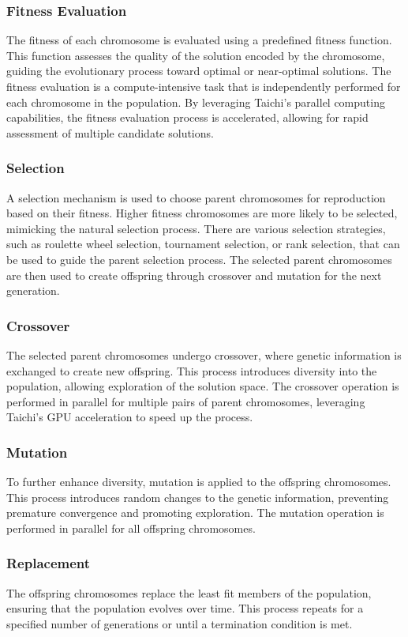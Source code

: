\documentclass[conference]{IEEEtran}
\begin{document}
\subsubsection{Fitness Evaluation}
The fitness of each chromosome is evaluated using a predefined fitness
function. This function assesses the quality of the solution encoded by the
chromosome, guiding the evolutionary process toward optimal or near-optimal
solutions. The fitness evaluation is a compute-intensive task that is
independently performed for each chromosome in the population. By leveraging
Taichi's parallel computing capabilities, the fitness evaluation process is
accelerated, allowing for rapid assessment of multiple candidate solutions.

\subsubsection{Selection}
A selection mechanism is used to choose parent chromosomes for reproduction
based on their fitness. Higher fitness chromosomes are more likely to be
selected, mimicking the natural selection process. There are various selection
strategies, such as roulette wheel selection, tournament selection, or rank
selection, that can be used to guide the parent selection process. The selected
parent chromosomes are then used to create offspring through crossover and
mutation for the next generation.

\subsubsection{Crossover}
The selected parent chromosomes undergo crossover, where genetic information is
exchanged to create new offspring. This process introduces diversity into the
population, allowing exploration of the solution space. The crossover operation
is performed in parallel for multiple pairs of parent chromosomes, leveraging
Taichi's GPU acceleration to speed up the process.

\subsubsection{Mutation}
To further enhance diversity, mutation is applied to the offspring chromosomes.
This process introduces random changes to the genetic information, preventing
premature convergence and promoting exploration. The mutation operation is
performed in parallel for all offspring chromosomes.

\subsubsection{Replacement}
The offspring chromosomes replace the least fit members of the population,
ensuring that the population evolves over time. This process repeats for a
specified number of generations or until a termination condition is met.
\end{document}
